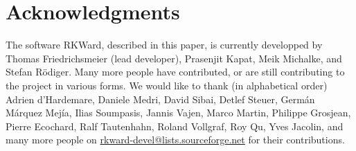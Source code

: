 \section{Acknowledgments}
\label{sec:acknowledgments}
The software RKWard, described in this paper, is currently developped by Thomas Friedrichsmeier (lead developer), Prasenjit Kapat, Meik Michalke,
and Stefan R\"odiger. Many more people have contributed, or are still contributing to the project in various forms. We would like to
thank (in alphabetical order) Adrien d'Hardemare, Daniele Medri, David Sibai, Detlef Steuer, Germ\'an M\'arquez Mej\'ia,
Ilias Soumpasis, Jannis Vajen, Marco Martin, Philippe Grosjean, Pierre Ecochard, Ralf Tautenhahn, Roland Vollgraf, Roy Qu,
Yves Jacolin, and many more people on \url{rkward-devel@lists.sourceforge.net} for their contributions.
